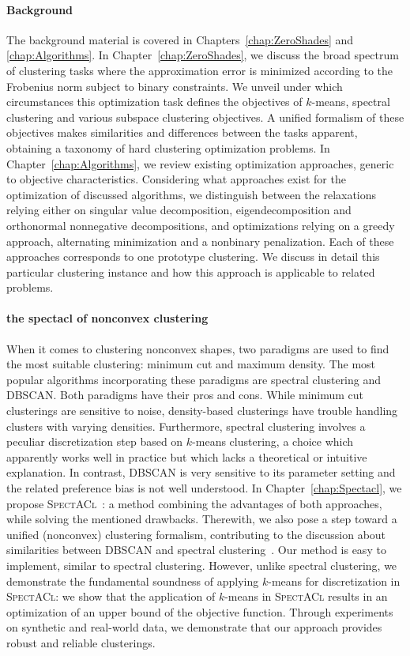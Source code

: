 \paragraph{Background} The background material is covered in Chapters~\ref{chap:ZeroShades} and \ref{chap:Algorithms}. In Chapter~\ref{chap:ZeroShades}, we discuss the broad spectrum of clustering tasks where the approximation error is minimized according to the Frobenius norm subject to binary constraints. We unveil under which circumstances this optimization task defines the objectives of $k$-means, spectral clustering and various subspace clustering objectives. A unified formalism of these objectives makes similarities and differences between the tasks apparent, obtaining a taxonomy of hard clustering optimization problems.
In Chapter~\ref{chap:Algorithms}, we review existing optimization approaches, generic to objective characteristics. Considering what approaches exist for the optimization of discussed algorithms, we distinguish between the relaxations relying either on singular value decomposition, eigendecomposition and orthonormal nonnegative decompositions, and optimizations relying on a greedy approach, alternating minimization and a nonbinary penalization.  Each of these approaches corresponds to one prototype clustering. We discuss in detail this particular clustering instance and how this approach is applicable to related problems.
\paragraph{the spectacl of nonconvex clustering} 
When it comes to clustering nonconvex shapes, two paradigms are used to find the most suitable clustering: minimum cut and maximum density. The most popular algorithms incorporating these paradigms are spectral clustering and DBSCAN. Both paradigms have their pros and cons. While minimum cut clusterings are sensitive to noise, density-based clusterings have trouble handling clusters with varying densities. Furthermore, spectral clustering involves a peculiar discretization step based on $k$-means clustering, a choice which apparently works well in practice but which lacks a theoretical or intuitive explanation. In contrast, DBSCAN is very sensitive to its parameter setting and the related preference bias is not well understood. In Chapter~\ref{chap:Spectacl}, we propose \textsc{SpectACl}~\citep{hess2019spectacl}: a method combining the advantages of both approaches, while solving the mentioned drawbacks. Therewith, we also pose a step toward a unified (nonconvex) clustering formalism, contributing to the discussion about similarities between DBSCAN and spectral clustering~\citep{schubert2018relationship}. Our method is easy to implement, similar to spectral clustering. However, unlike spectral clustering, we demonstrate the fundamental soundness of applying $k$-means for discretization in \textsc{SpectACl}: we show that the application of $k$-means in \textsc{SpectACl} results in an optimization of an upper bound of the objective function. Through experiments on synthetic and real-world data, we demonstrate that our approach provides robust and reliable clusterings. 

